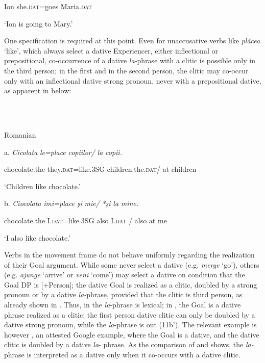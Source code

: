 \documentclass[output=paper,modfonts,nonflat]{langsci/langscibook}
\begin{document}
    Ion   she.\textsc{dat}=goes   Maria.\textsc{dat}

    ‘Ion is going to Mary.’

One specification is required at this point. Even for unaccusative verbs like \textit{plăcea} ‘like’, which always select a dative Experiencer, either inflectional or prepositional, co-occurrence of a dative \textit{la-}phrase with a clitic is possible only in the third person; in the first and in the second person, the clitic may co-occur only with an inflectional dative strong pronoun, never with a prepositional dative, as apparent in  below:

\ea%
    \label{ex:key:10}
    \gll\\
        \\
    \glt
    \z

          Romanian

  a.  \textit{Cicolata}  \textit{le=place}     \textit{copiilor/}  \textit{la} \textit{copii.}

    chocolate.the  they.\textsc{dat}=like.3SG  children.the.\textsc{dat}/ at children

    ‘Children like chocolate.’

  b.  \textit{Ciocolata}  \textit{îmi=place}   \textit{şi} \textit{mie/}     \textit{*şi}  \textit{la} \textit{mine.}

    chocolate.the  I.\textsc{dat}=like.3SG  also I.\textsc{dat} /  also at me

    ‘I also like chocolate.’  

Verbs in the movement frame do not behave uniformly regarding the realization of their Goal argument. While some never select a dative (e.g. \textit{merge} ‘go’), others (e.g. \textit{ajunge} ‘arrive’ or \textit{veni} ‘come’) may select a dative on condition that the Goal DP is [+Person]; the dative Goal is realized as a clitic, doubled by a strong pronoun or by a dative \textit{la-}phrase, provided that the clitic is third person, as already shown in . Thus, in  the \textit{la}{}-phrase is lexical; in , the Goal is a dative phrase realized as a clitic; the first person dative clitic can only be doubled by a dative strong pronoun, while the \textit{la}{}-phrase is out (11b’). The relevant example is however , an attested Google example, where the Goal is a dative, and the dative clitic is doubled by a dative \textit{la}{}- phrase. As the comparison of  and  shows, the \textit{la-}phrase is interpreted as a dative only when it co-occurs with a dative clitic.
\end{document}
